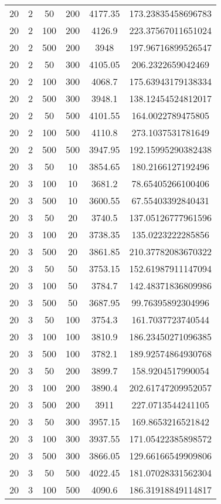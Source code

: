 {\begin{longtabu}{S
S
S
S
S[round-mode=places, round-precision=0]
S[round-mode=places, round-precision=0]}
20 & 2 & 50 & 200 & 4177.35 & 173.23835458696783 \\
20 & 2 & 100 & 200 & 4126.9 & 223.37567011651024 \\
20 & 2 & 500 & 200 & 3948 & 197.96716899526547 \\
20 & 2 & 50 & 300 & 4105.05 & 206.2322659042469 \\
20 & 2 & 100 & 300 & 4068.7 & 175.63943179138334 \\
20 & 2 & 500 & 300 & 3948.1 & 138.12454524812017 \\
20 & 2 & 50 & 500 & 4101.55 & 164.0022789475805 \\
20 & 2 & 100 & 500 & 4110.8 & 273.1037531781649 \\
20 & 2 & 500 & 500 & 3947.95 & 192.15995290382438 \\
20 & 3 & 50 & 10 & 3854.65 & 180.2166127192496 \\
20 & 3 & 100 & 10 & 3681.2 & 78.65405266100406 \\
20 & 3 & 500 & 10 & 3600.55 & 67.55403392840431 \\
20 & 3 & 50 & 20 & 3740.5 & 137.05126777961596 \\
20 & 3 & 100 & 20 & 3738.35 & 135.0223222285856 \\
20 & 3 & 500 & 20 & 3861.85 & 210.37782083670322 \\
20 & 3 & 50 & 50 & 3753.15 & 152.61987911147094 \\
20 & 3 & 100 & 50 & 3784.7 & 142.48371836809986 \\
20 & 3 & 500 & 50 & 3687.95 & 99.76395892304996 \\
20 & 3 & 50 & 100 & 3754.3 & 161.7037723740544 \\
20 & 3 & 100 & 100 & 3810.9 & 186.23450271096385 \\
20 & 3 & 500 & 100 & 3782.1 & 189.92574864930768 \\
20 & 3 & 50 & 200 & 3899.7 & 158.9204517990054 \\
20 & 3 & 100 & 200 & 3890.4 & 202.61747209952057 \\
20 & 3 & 500 & 200 & 3911 & 227.0713544241105 \\
20 & 3 & 50 & 300 & 3957.15 & 169.8653216521842 \\
20 & 3 & 100 & 300 & 3937.55 & 171.05422385898572 \\
20 & 3 & 500 & 300 & 3866.05 & 129.66166549909806 \\
20 & 3 & 50 & 500 & 4022.45 & 181.07028331562304 \\
20 & 3 & 100 & 500 & 4090.6 & 186.31918849114817 \\

\end{longtabu}}
